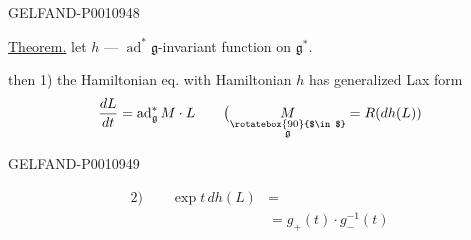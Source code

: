 \begin{GelfandAdjacentEvidence}{GELFAND-P001094}{8}


\underline{Theorem.} let $h$ — $\operatorname{ad}^*\mathfrak g$-invariant function on $\mathfrak g^*$.

then 1) the Hamiltonian eq. with Hamiltonian $h$ has generalized Lax form
\[
\frac{dL}{dt}=\operatorname{ad}_{\mathfrak g}^{*}M\cdot L
\qquad
\bigl(\underset{\substack{\rotatebox{90}{$\in$}\\ \mathfrak g}}{M}=R(dh(L))
\]
\end{GelfandAdjacentEvidence}
\begin{GelfandAdjacentEvidence}{GELFAND-P001094}{9}


\[
\begin{aligned}
2)\qquad \exp t\,dh(L)&={}\\
&=g_+(t)\cdot g_-^{-1}(t)
\end{aligned}
\]
\end{GelfandAdjacentEvidence}



